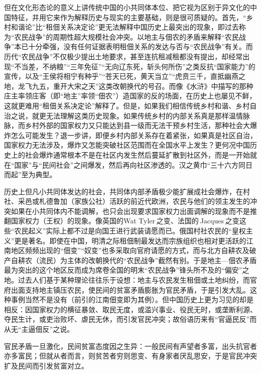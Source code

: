 \documentclass[a4paper,12pt,punct=kaiming]{ctexart}
\begin{document}
但在文化形态论的意义上讲传统中国的小共同体本位、把它视为区别于异文化的中国特征，并用它来作为解释历史与现实的主要基础，则是很可质疑的。首先，“乡村和谐论”比“租佃关系决定论”更无法解释中国历史上最突出的现象，即过去称为“农民战争”的周期性超大规模社会冲突。以地主与佃农的矛盾来解释“农民战争”本已十分牵强，没有任何证据表明租佃关系的发达与否与“农民战争”有关。而历代“农民战争”不仅极少提出土地要求，甚至连抗租减租都没有提出，却经常出现“不当差，不纳粮”“三年免征”“无向辽东死，斩头何所伤”之类反抗“国家能力”的宣传，以及“王侯将相宁有种乎”“苍天已死，黄天当立”“虎贲三千，直抵幽燕之地，龙飞九五，重开大宋之天”这类改朝换代的号召。而像《水浒》中描写的那种庄主率领庄客（即“地主”率领“佃农”）造国家的反的场面，在历史上也屡见不鲜，这就更难用“租佃关系决定论”解释了。但是，如果我们相信传统乡村和谐、乡村自治之说，就更无法理解这类历史现象。如果传统乡村的内部关系真是那样温情脉脉，而乡村外部的国家权力又只能达到县一级而无法干预乡村生活，那种社会大爆炸怎么可能发生？退一步讲，即便乡村内部关系存在着紧张，如果真是社区自治，国家权力无法涉及，爆炸又怎能突破社区范围而在全国水平上发生？更何况中国历史上的社会爆炸通常根本不是在社区内发生然后蔓延扩散到社区外，而是一开始就在“国家”与“民间社会”之间爆发，然后再向社区渗透的。汉之黄巾“三十六方同日而起”至为典型。

历史上但凡小共同体发达的社会，共同体内部矛盾极少能扩展成社会爆炸，在村社、采邑或札德鲁加（家族公社）活跃的前近代欧洲，农民与他们的领主发生的冲突如果在小共同体内不能调解，也只会出现要求国家权力出面调解的现象而不是推翻国家权力（王权）的现象。像英国的Wat Tyler 之变、法国的 Jacques 之变这些“农民起义”实际上都不过是向国王进行武装请愿而已。俄国村社农民的“皇权主义”更是著名。即使在中国，明清之际租佃制最发达而宗族组织也相对更活跃的江南地区频频出现的“佃变”“奴变”也多采取向官府请愿的方式，而与北方自耕农及破产自耕农（流民）为主体的改朝换代的“农民战争”截然有别。于是地主—佃农矛盾最为突出的这个地区反而成为席卷全国的明末“农民战争”锋头所不及的“偏安”之地。过去人们基于某种理论往往乐于设想：地主与农民发生租佃或土地纠纷，而官府出面支持地主镇压农民，使民间的贫富矛盾膨胀为官民矛盾，于是引发大乱。这种事例当然不是没有（前引的江南佃变即为其例）。但中国历史上更为习见的却是相反：因国家权力的横征暴敛、取民无度，或滥兴事业、役民无时，或垄断利源、夺民生计，或吏治败坏、虐民无休，而引发官民冲突；故俗语历来有“官逼民反”而从无“主逼佃反”之说。

官民矛盾一旦激化，民间贫富态度因之生异：一般民间有声望者多富，出头抗官者亦多富民；但就从者而言，则贫苦者穷则思变、有身家者厌乱思安，于是官民冲突扩及民间而引发贫富对立。
\end{document}
